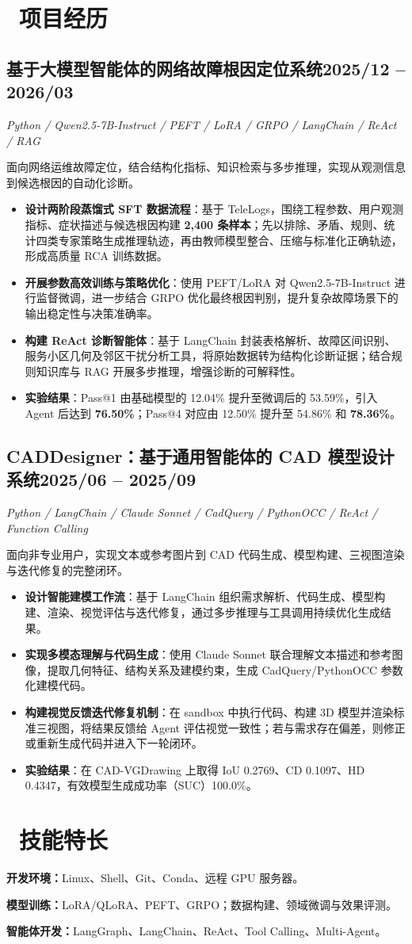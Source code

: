 \documentclass[10pt,a4paper]{article}
\newcommand{\datedsubsection}[2]{\subsection{\textbf{#1}\hfill\normalfont\small #2}}
\newcommand{\tech}[1]{{\fontsize{9.3}{12}\selectfont\itshape #1\par}\vspace{1pt}}
\begin{document}
\section{\faCode\ 项目经历}
\datedsubsection{基于大模型智能体的网络故障根因定位系统}{2025/12 -- 2026/03}
\tech{Python / Qwen2.5-7B-Instruct / PEFT / LoRA / GRPO / LangChain / ReAct / RAG}
面向网络运维故障定位，结合结构化指标、知识检索与多步推理，实现从观测信息到候选根因的自动化诊断。
\begin{itemize}
  \item \textbf{设计两阶段蒸馏式 SFT 数据流程}：基于 TeleLogs，围绕工程参数、用户观测指标、症状描述与候选根因构建 \textbf{2,400 条样本}；先以排除、矛盾、规则、统计四类专家策略生成推理轨迹，再由教师模型整合、压缩与标准化正确轨迹，形成高质量 RCA 训练数据。
  \item \textbf{开展参数高效训练与策略优化}：使用 PEFT/LoRA 对 Qwen2.5-7B-Instruct 进行监督微调，进一步结合 GRPO 优化最终根因判别，提升复杂故障场景下的输出稳定性与决策准确率。
  \item \textbf{构建 ReAct 诊断智能体}：基于 LangChain 封装表格解析、故障区间识别、服务小区几何及邻区干扰分析工具，将原始数据转为结构化诊断证据；结合规则知识库与 RAG 开展多步推理，增强诊断的可解释性。
  \item \textbf{实验结果}：Pass@1 由基础模型的 12.04\% 提升至微调后的 53.59\%，引入 Agent 后达到 \textbf{76.50\%}；Pass@4 对应由 12.50\% 提升至 54.86\% 和 \textbf{78.36\%}。
\end{itemize}
\vspace{3pt}
\datedsubsection{CADDesigner：基于通用智能体的 CAD 模型设计系统}{2025/06 -- 2025/09}
\tech{Python / LangChain / Claude Sonnet / CadQuery / PythonOCC / ReAct / Function Calling}
面向非专业用户，实现文本或参考图片到 CAD 代码生成、模型构建、三视图渲染与迭代修复的完整闭环。
\begin{itemize}
  \item \textbf{设计智能建模工作流}：基于 LangChain 组织需求解析、代码生成、模型构建、渲染、视觉评估与迭代修复，通过多步推理与工具调用持续优化生成结果。
  \item \textbf{实现多模态理解与代码生成}：使用 Claude Sonnet 联合理解文本描述和参考图像，提取几何特征、结构关系及建模约束，生成 CadQuery/PythonOCC 参数化建模代码。
  \item \textbf{构建视觉反馈迭代修复机制}：在 sandbox 中执行代码、构建 3D 模型并渲染标准三视图，将结果反馈给 Agent 评估视觉一致性；若与需求存在偏差，则修正或重新生成代码并进入下一轮闭环。
  \item \textbf{实验结果}：在 CAD-VGDrawing 上取得 IoU 0.2769、CD 0.1097、HD 0.4347，有效模型生成成功率（SUC）100.0\%。
\end{itemize}
\section{\faCogs\ 技能特长}
\textbf{开发环境：}Linux、Shell、Git、Conda、远程 GPU 服务器。\par
\textbf{模型训练：}LoRA/QLoRA、PEFT、GRPO；数据构建、领域微调与效果评测。\par
\textbf{智能体开发：}LangGraph、LangChain、ReAct、Tool Calling、Multi-Agent。
\end{document}

